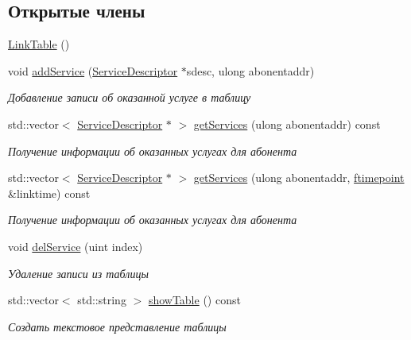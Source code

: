 \subsection*{Открытые члены}
\begin{DoxyCompactItemize}
\item 
\hyperlink{class_network_service_1_1_link_table_a3f2e438b8ec892df7cb813a94d74a159}{Link\+Table} ()
\item 
void \hyperlink{class_network_service_1_1_link_table_a31612d870964984c4d6c83208a28684d}{add\+Service} (\hyperlink{class_network_service_1_1_service_descriptor}{Service\+Descriptor} $\ast$sdesc, ulong abonentaddr)
\begin{DoxyCompactList}\small\item\em Добавление записи об оказанной услуге в таблицу \end{DoxyCompactList}\item 
std\+::vector$<$ \hyperlink{class_network_service_1_1_service_descriptor}{Service\+Descriptor} $\ast$ $>$ \hyperlink{class_network_service_1_1_link_table_ac1d3769516f51abd5eb7766d009a54fb}{get\+Services} (ulong abonentaddr) const 
\begin{DoxyCompactList}\small\item\em Получение информации об оказанных услугах для абонента \end{DoxyCompactList}\item 
std\+::vector$<$ \hyperlink{class_network_service_1_1_service_descriptor}{Service\+Descriptor} $\ast$ $>$ \hyperlink{class_network_service_1_1_link_table_a44427b02da77b0478b71ac73ea3e0ef5}{get\+Services} (ulong abonentaddr, \hyperlink{networkservice_8h_ac877dfabb0f4f6a8184aa821b447e81d}{ftimepoint} \&linktime) const 
\begin{DoxyCompactList}\small\item\em Получение информации об оказанных услугах для абонента \end{DoxyCompactList}\item 
void \hyperlink{class_network_service_1_1_link_table_a4aef03eef2e1ed5d60f99075eff7aa96}{del\+Service} (uint index)
\begin{DoxyCompactList}\small\item\em Удаление записи из таблицы \end{DoxyCompactList}\item 
std\+::vector$<$ std\+::string $>$ \hyperlink{class_network_service_1_1_link_table_a5381c7f8fd23c726dd1c89e429f9e8e2}{show\+Table} () const 
\begin{DoxyCompactList}\small\item\em Создать текстовое представление таблицы \end{DoxyCompactList}\item 

\end{DoxyCompactItemize}
